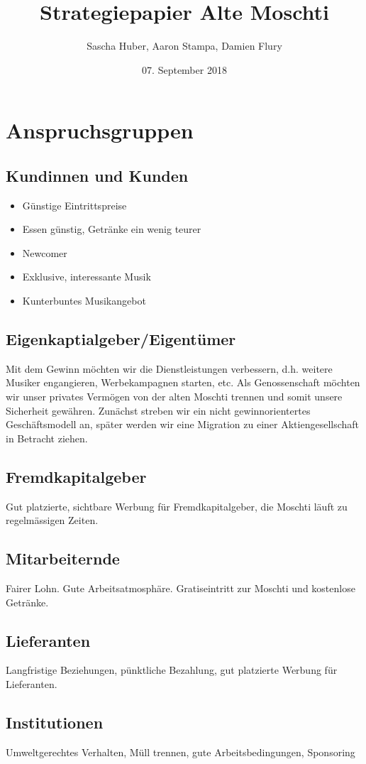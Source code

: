 \documentclass[a4paper, titlepage]{article}
\title{Strategiepapier Alte Moschti}
\author{Sascha Huber, Aaron Stampa, Damien Flury}
\date{07. September 2018}
\begin{document}
\maketitle

\tableofcontents
\newpage

\section{Anspruchsgruppen}
\subsection{Kundinnen und Kunden}
\begin{itemize}
  \item Günstige Eintrittspreise
  \item Essen günstig, Getränke ein wenig teurer
  \item Newcomer
  \item Exklusive, interessante Musik
  \item Kunterbuntes Musikangebot
\end{itemize}
\subsection{Eigenkaptialgeber/Eigentümer}
Mit dem Gewinn möchten wir die Dienstleistungen verbessern, d.h. weitere Musiker engangieren,
Werbekampagnen starten, etc. Als Genossenschaft möchten wir unser privates Vermögen von der
alten Moschti trennen und somit unsere Sicherheit gewähren. Zunächst streben wir ein nicht gewinnorientertes
Geschäftsmodell an, später werden wir eine Migration zu einer Aktiengesellschaft in Betracht ziehen.
\subsection{Fremdkapitalgeber}
Gut platzierte, sichtbare Werbung für Fremdkapitalgeber, die Moschti läuft zu regelmässigen Zeiten.
\subsection{Mitarbeiternde}
Fairer Lohn. Gute Arbeitsatmosphäre. Gratiseintritt zur Moschti und kostenlose Getränke.
\subsection{Lieferanten}
Langfristige Beziehungen, pünktliche Bezahlung, gut platzierte Werbung für Lieferanten.
\subsection{Institutionen}
Umweltgerechtes Verhalten, Müll trennen, gute Arbeitsbedingungen, Sponsoring
\end{document}

